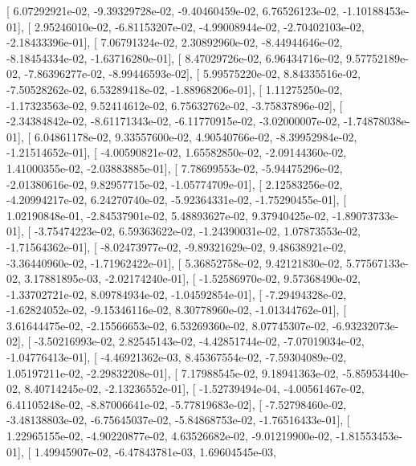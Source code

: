 \documentclass{article}
\begin{document}
       [  6.07292921e-02,  -9.39329728e-02,  -9.40460459e-02,
          6.76526123e-02,  -1.10188453e-01],
       [  2.95246010e-02,  -6.81153207e-02,  -4.99008944e-02,
         -2.70402103e-02,  -2.18433396e-01],
       [  7.06791324e-02,   2.30892960e-02,  -8.44944646e-02,
         -8.18454334e-02,  -1.63716280e-01],
       [  8.47029726e-02,   6.96434716e-02,   9.57752189e-02,
         -7.86396277e-02,  -8.99446593e-02],
       [  5.99575220e-02,   8.84335516e-02,  -7.50528262e-02,
          6.53289418e-02,  -1.88968206e-01],
       [  1.11275250e-02,  -1.17323563e-02,   9.52414612e-02,
          6.75632762e-02,  -3.75837896e-02],
       [ -2.34384842e-02,  -8.61171343e-02,  -6.11770915e-02,
         -3.02000007e-02,  -1.74878038e-01],
       [  6.04861178e-02,   9.33557600e-02,   4.90540766e-02,
         -8.39952984e-02,  -1.21514652e-01],
       [ -4.00590821e-02,   1.65582850e-02,  -2.09144360e-02,
          1.41000355e-02,  -2.03883885e-01],
       [  7.78699553e-02,  -5.94475296e-02,  -2.01380616e-02,
          9.82957715e-02,  -1.05774709e-01],
       [  2.12583256e-02,  -4.20994217e-02,   6.24270740e-02,
         -5.92364331e-02,  -1.75290455e-01],
       [  1.02190848e-01,  -2.84537901e-02,   5.48893627e-02,
          9.37940425e-02,  -1.89073733e-01],
       [ -3.75474223e-02,   6.59363622e-02,  -1.24390031e-02,
          1.07873553e-02,  -1.71564362e-01],
       [ -8.02473977e-02,  -9.89321629e-02,   9.48638921e-02,
         -3.36440960e-02,  -1.71962422e-01],
       [  5.36852758e-02,   9.42121830e-02,   5.77567133e-02,
          3.17881895e-03,  -2.02174240e-01],
       [ -1.52586970e-02,   9.57368490e-02,  -1.33702721e-02,
          8.09784934e-02,  -1.04592854e-01],
       [ -7.29494328e-02,  -1.62824052e-02,  -9.15346116e-02,
          8.30778960e-02,  -1.01344762e-01],
       [  3.61644475e-02,  -2.15566653e-02,   6.53269360e-02,
          8.07745307e-02,  -6.93232073e-02],
       [ -3.50216993e-02,   2.82545143e-02,  -4.42851744e-02,
         -7.07019034e-02,  -1.04776413e-01],
       [ -4.46921362e-03,   8.45367554e-02,  -7.59304089e-02,
          1.05197211e-02,  -2.29832208e-01],
       [  7.17988545e-02,   9.18941363e-02,  -5.85953440e-02,
          8.40714245e-02,  -2.13236552e-01],
       [ -1.52739494e-04,  -4.00561467e-02,   6.41105248e-02,
         -8.87006641e-02,  -5.77819683e-02],
       [ -7.52798460e-02,  -3.48138803e-02,  -6.75645037e-02,
         -5.84868753e-02,  -1.76516433e-01],
       [  1.22965155e-02,  -4.90220877e-02,   4.63526682e-02,
         -9.01219900e-02,  -1.81553453e-01],
       [  1.49945907e-02,  -6.47843781e-03,   1.69604545e-03,
\end{document}
